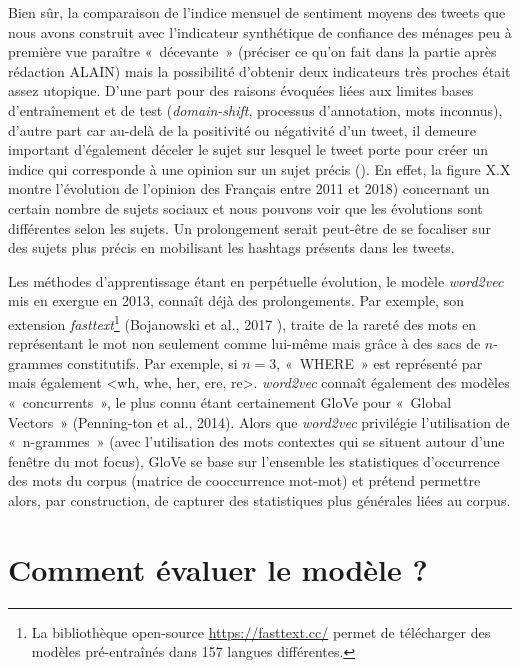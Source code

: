 \documentclass[11pt,french,french]{article}
\let\rmarkdownfootnote\footnote%
\def\footnote{\protect\rmarkdownfootnote}
\begin{document}
Bien sûr, la comparaison de l'indice mensuel de sentiment moyens des tweets que nous avons construit avec l'indicateur synthétique de confiance des ménages peu à première vue paraître «~décevante~» \colorbox{BurntOrange}{(préciser ce qu’on fait dans la partie après rédaction ALAIN)} mais la possibilité d'obtenir deux indicateurs très proches était assez utopique.
D'une part pour des raisons évoquées liées aux limites bases d'entraînement et de test (\emph{domain-shift}, processus d'annotation, mots inconnus), d'autre part car au-delà de la positivité ou négativité d'un tweet, il demeure important d'également déceler le sujet sur lesquel le tweet porte pour créer un indice qui corresponde à une opinion sur un sujet précis ().
En effet, la figure X.X montre l'évolution de l'opinion des Français entre 2011 et 2018) concernant un certain nombre de sujets sociaux et nous pouvons voir que les évolutions sont différentes selon les sujets.
Un prolongement serait peut-être de se focaliser sur des sujets plus précis en mobilisant les hashtags présents dans les tweets.

Les méthodes d'apprentissage étant en perpétuelle évolution, le modèle \emph{word2vec} mis en exergue en 2013, connaît déjà des prolongements.
Par exemple, son extension \emph{fasttext}\footnote{La bibliothèque open-source \url{https://fasttext.cc/} permet de télécharger des modèles pré-entraînés dans 157 langues différentes.} (Bojanowski et al., 2017 ), traite de la rareté des mots en représentant le mot non seulement comme lui-même mais grâce à des sacs de \(n\)-grammes constitutifs.
Par exemple, si \(n = 3\), «~WHERE~» est représenté par mais également \textless{}wh, whe, her, ere, re\textgreater{}. \emph{word2vec} connaît également des modèles «~concurrents~», le plus connu étant certainement GloVe pour «~Global Vectors~» (Penning-ton et al., 2014).
Alors que \emph{word2vec} privilégie l'utilisation de «~n-grammes~» (avec l'utilisation des mots contextes qui se situent autour d'une fenêtre du mot focus), GloVe se base sur l'ensemble les statistiques d'occurrence des mots du corpus (matrice de cooccurrence mot-mot) et prétend permettre alors, par construction, de capturer des statistiques plus générales liées au corpus.

\newpage

\hypertarget{appendix-appendix}{%
\appendix}


\hypertarget{annexe:commentEvaluer}{%
\section{Comment évaluer le modèle ?}\label{annexe:commentEvaluer}}
\end{document}
